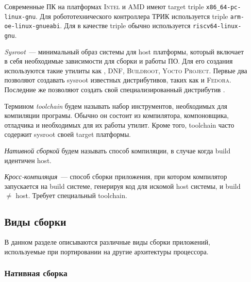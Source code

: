 Современные ПК на платформах \textsc{Intel} и \textsc{AMD} имеют target triple \texttt{x86\_64-pc-linux-gnu}.
Для робототехнического контроллера ТРИК используется triple \texttt{arm-oe-linux-gnueabi}.
Для \riscv{} в качестве triple обычно используется \texttt{riscv64-linux-gnu}.

\begin{definition}[Sysroot]
	\textit{Sysroot}~--- минимальный образ системы для host платформы, который включает в себя необходимые зависимости для сборки и работы ПО.
	Для его создания используются такие утилиты как \debootstrap{}, \textsc{DNF}, \textsc{Buildroot}, \textsc{Yocto Project}.
	Первые два позволяют создавать sysroot известных дистрибутивов, таких как \debian{} и \textsc{Fedora}.
	Последние же позволяют создать свой специализированный дистрибутив \linux{}.
\end{definition}

\begin{definition}[Toolchain]
	Термином \textit{toolchain} будем называть набор инструментов, необходимых для компиляции програмы.
	Обычно он состоит из компилятора, компоновщика, отладчика и необходимых для их работы утилит.
	Кроме того, toolchain часто содержит sysroot своей target платформы.
\end{definition}

\begin{definition}
	\textit{Нативной сборкой} будем называть способ компиляции, в случае когда build идентичен host.
\end{definition}

\begin{definition}
	\textit{Кросс-компиляция}~--- способ сборки приложения, при котором компилятор запускается на build системе, генерируя код для искомой host системы, и build $\neq$ host.
	Требует специальный toolchain.
\end{definition}


\subsection{Виды сборки}

В данном разделе описываются различные виды сборки приложений, используемые при портировании на другие архитектуры процессора.

\subsubsection{Нативная сборка}

